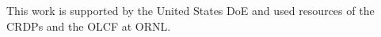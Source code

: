 This work is supported by the United States \ac{DoE} and used resources of the \aclp{CRDP} and the \ac{OLCF} at \acl{ORNL}.
